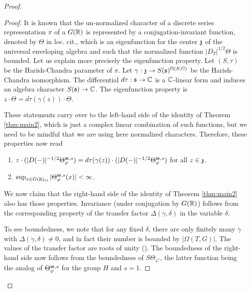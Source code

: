 \documentclass{article}
\theoremstyle{definition}
\numberwithin{equation}{section}
\renewcommand{\-}{\hyp{}}
\begin{document}
\begin{proof}
\begin{proof}
		

		It is known \cite[Theorem 3]{HCDSI} that the un-normalized character of a discrete series representation $\pi$ of a $G(\mathbb{R})$ is represented by a conjugation-invariant function, denoted by $\Theta$ in loc. cit., which is an eigenfunction for the center $\mathfrak{z}$ of the universal enveloping algebra and such that the normalized function $|D_T|^{1/2}\Theta$ is bounded. Let us explain more precisely the eigenfunction property. Let $(S,\tau)$ be the Harish-Chandra parameter of $\pi$. Let $\gamma : \mathfrak{z} \to S(\mathfrak{s})^{\Omega(S,G)}$ be the Harish-Chandra isomorphism. The differential $d\tau : \mathfrak{s} \to \mathbb{C}$ is a $\mathbb{C}$-linear form and induces an algebra character $S(\mathfrak{s}) \to \mathbb{C}$. The eigenfunction property is $z \cdot \Theta = d\tau(\gamma(z)) \cdot \Theta$.

		These statements carry over to the left-hand side of the identity of Theorem \ref{thm:main2}, which is just a complex linear combination of such functions, but we need to be mindful that we are using here normalized characters. Therefore, these properties now read
		\begin{enumerate}
			\item $z \cdot (|D(-)|^{-1/2}\Theta_\varphi^{\mathfrak{w},s}) = d\tau(\gamma(z)) \cdot (|D(-)|^{-1/2}\Theta_\varphi^{\mathfrak{w},s})$ for all $z \in \mathfrak{z}$.
			\item $\sup_{x \in G(\mathbb{R})_{\textrm{rs}}}|\Theta_\varphi^{\mathfrak{w},s}(x)|<\infty$.
		\end{enumerate}

		We now claim that the right-hand side of the identity of Theorem \ref{thm:main2} also has those properties. Invariance (under conjugation by $G(\mathbb{R})$) follows from the corresponding property of the transfer factor $\Delta(\dot\gamma,\delta)$ in the variable $\delta$. 

		To see boundedness, we note that for any fixed $\delta$, there are only finitely many $\dot\gamma$ with $\Delta(\dot\gamma,\delta) \neq 0$, and in fact their number is bounded by $|\Omega(T,G)|$. The values of the transfer factor are roots of unity (\cite[Lemma 4.3.3]{KalHDC}). The boundedness of the right-hand side now follows from the boundedness of $S\Theta_{\varphi'}$, the latter function being the analog of $\Theta_\varphi^{\mathfrak{w},s}$ for the group $H$ and $s=1$.


\end{proof}
\end{proof}
\end{document}
